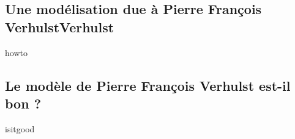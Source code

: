 \subsection{Une modélisation due à Pierre François VerhulstVerhulst}

{howto}



\subsection{Le modèle de Pierre François Verhulst est-il bon ?}

{isitgood}
